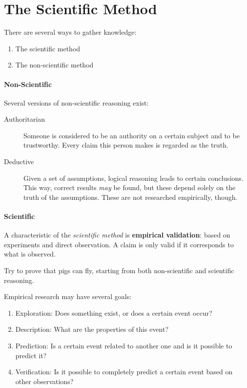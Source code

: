 \section{The Scientific Method}
\label{sec:onderzoeksproces-wetenschappelijke-methode}

There are several ways to gather knowledge:

\begin{enumerate}
    \item The scientific method    
    \item The non-scientific method
\end{enumerate}

\paragraph{Non-Scientific} Several versions of non-scientific reasoning exist:
\begin{description}
	\item [Authoritarian] Someone is considered to be an authority on a certain subject and to be trustworthy. Every claim this person makes is regarded as the truth.
	\item [Deductive] Given a set of assumptions, logical reasoning leads to certain conclusions. This way, correct results \emph{may} be found, but these depend solely on the truth of the assumptions. These are not researched empirically, though.
\end{description}

\paragraph{Scientific} 
A characteristic of the \textsl{scientific method} is \textbf{empirical validation}: based on experiments and direct observation. A claim is only valid if it corresponds to what is observed.

\begin{exercise}
Try to prove that pigs can fly, starting from both non-scientific and scientific reasoning.
\end{exercise}

Empirical research may have several goals:
\begin{enumerate}
    \item Exploration: Does something exist, or does a certain event occur?
    \item Description: What are the properties of this event?
    \item Prediction: Is a certain event related to another one and is it possible to predict it?
    \item Verification: Is it possible to completely predict a certain event based on other observations?
\end{enumerate}

